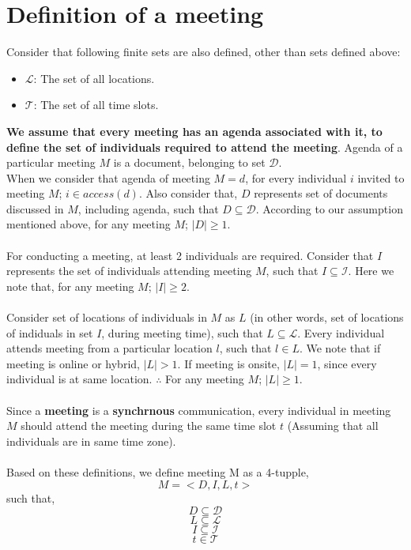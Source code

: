 \documentclass{article}
\begin{document}
\section{Definition of a meeting}
\noindent
Consider that following finite sets are also defined, other than sets defined above:
\begin{itemize}
    \item $\mathcal{L}$: The set of all locations.
    \item $\mathcal{T}$: The set of all time slots.\\
\end{itemize}
\noindent
\textbf{We assume that every meeting has an agenda associated with it, to define the set of individuals required to attend the meeting}. Agenda of a particular meeting $M$ is a document, belonging to set $\mathcal{D}$.\\
When we consider that agenda of meeting $M = d$, for every individual $i$ invited to meeting $M$; $i \in access(d)$. Also consider that, $D$ represents set of documents discussed in $M$, including agenda, such that $D \subseteq \mathcal{D}$. According to our assumption mentioned above, for any meeting $M$; $|D| \geq 1$.\\ \\ 
For conducting a meeting, at least 2 individuals are required. Consider that $I$ represents the set of individuals attending meeting $M$, such that $I \subseteq \mathcal{I}$. Here we note that, for any meeting $M$; $|I| \geq 2$.\\ \\  
Consider set of locations of individuals in $M$ as $L$ (in other words, set of locations of indiduals in set $I$, during meeting time), such that $L \subseteq \mathcal{L}$. Every individual attends meeting from a particular location $l$, such that $l \in L$. We note that if meeting is online or hybrid, $|L| > 1$. If meeting is onsite, $|L| = 1$, since every individual is at same location. $\therefore$ For any meeting $M$; $|L| \geq 1$. \\ \\
Since a \textbf{meeting} is a \textbf{synchrnous} communication, every individual in meeting $M$ should attend the meeting during the same time slot $t$ (Assuming that all individuals are in same time zone).  \\ \\
Based on these definitions, we define meeting M as a 4-tupple,
    \[ M = < D, I, L, t > \]
such that,
    \[ D \subseteq \mathcal{D} \]
    \[ L \subseteq \mathcal{L} \]
    \[ I \subseteq \mathcal{I} \]
    \[ t \in \mathcal{T} \]
\end{document}
